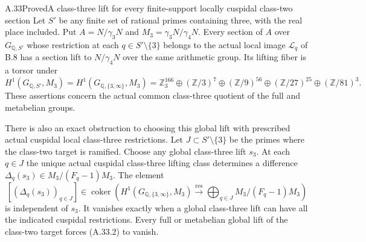 \begin{statement}{A.33}{Proved}{A class-three lift for every finite-support locally cuspidal class-two section}
Let $S'$ be any finite set of rational primes containing three,
with the real place included. Put $A=N/\gamma_3N$ and
$M_3=\gamma_3N/\gamma_4N$. Every section of $A$ over
$G_{\mathbb Q,S'}$ whose restriction at each
$q\in S'\setminus\{3\}$ belongs to the actual local image
$\mathscr L_q$ of B.8 has a section lift to $N/\gamma_4N$
over the same arithmetic group. Its lifting fiber is a torsor under
\[
 H^1(G_{\mathbb Q,S'},M_3)
 =H^1(G_{\mathbb Q,\{3,\infty\}},M_3)
 =\mathbb Z_3^{166}\oplus(\mathbb Z/3)^7
   \oplus(\mathbb Z/9)^{56}
   \oplus(\mathbb Z/27)^{25}
   \oplus(\mathbb Z/81)^3.
 \tag{A.33.1}
\]
These assertions concern the actual common class-three quotient
of the full and metabelian groups.

There is also an exact obstruction to choosing this global lift
with prescribed actual cuspidal local class-three restrictions.
Let $J\subset S'\setminus\{3\}$ be the primes where the
class-two target is ramified. Choose any global class-three lift
$s_3$. At each $q\in J$ the unique actual cuspidal class-three
lifting class determines a difference
$\Delta_q(s_3)\in M_3/(F_q-1)M_3$. The element
\[
 \left[(\Delta_q(s_3))_{q\in J}\right]
 \in\operatorname{coker}\left(
 H^1(G_{\mathbb Q,\{3,\infty\}},M_3)
 \xrightarrow{\operatorname{res}}
 \bigoplus_{q\in J}M_3/(F_q-1)M_3\right)
 \tag{A.33.2}
\]
is independent of $s_3$. It vanishes exactly when a global
class-three lift can have all the indicated cuspidal restrictions.
Every full or metabelian global lift of the class-two target
forces (A.33.2) to vanish.
\end{statement}
